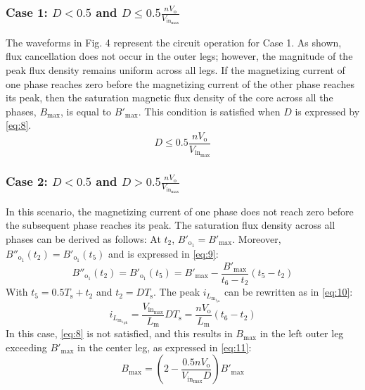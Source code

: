 \documentclass[lettersize,journal]{IEEEtran}
\begin{document}
\subsubsection*{\textup{Case 1: $D < 0.5$ and $D \le 0.5 \frac{n V_{\mathrm{o}}}{V_{\mathrm{in}_{\mathrm{max}}}}$}}
The waveforms in Fig. 4 represent the circuit operation for Case 1. As shown, flux cancellation does not occur in the outer legs; however, the magnitude of the peak flux density remains uniform across all legs. If the magnetizing current of one phase reaches zero before the magnetizing current of the other phase reaches its peak, then the saturation magnetic flux density of the core across all the phases, $B_{\mathrm{max}}$, is equal to $B'_{\mathrm{max}}$. This condition is satisfied when $D$ is expressed by \eqref{eq:8}.
\begin{equation}
\label{eq:8}
D \le 0.5 \frac{n V_{\mathrm{o}}}{V_{\mathrm{in}_{\mathrm{max}}}}
\end{equation}

\subsubsection*{\textup{Case 2: $D < 0.5$ and $D > 0.5 \frac{n V_{\mathrm{o}}}{V_{\mathrm{in}_{\mathrm{max}}}}$}}
In this scenario, the magnetizing current of one phase does not reach zero before the subsequent phase reaches its peak. The saturation flux density across all phases can be derived as follows: At $t_2$, $B'_{\mathrm{o}_1} = B'_{\mathrm{max}}$. Moreover, $B''_{\mathrm{o}_1}(t_2) = B'_{\mathrm{o}_1}(t_5)$ and is expressed in \eqref{eq:9}:
\begin{equation}
\label{eq:9}
B''_{\mathrm{o}_1}(t_2) = B'_{\mathrm{o}_1}(t_5) = B'_{\mathrm{max}} - \frac{B'_{\mathrm{max}}}{t_6 - t_2}(t_5 - t_2)
\end{equation}
With $t_5 = 0.5 T_{\mathrm{s}} + t_2$ and $t_2 = D T_{\mathrm{s}}$. The peak $i_{L_{\mathrm{m}_{1_{\mathrm{pk}}}}}$ can be rewritten as in \eqref{eq:10}:
\begin{equation}
\label{eq:10}
i_{L_{{{\mathrm{m}_1}_{\mathrm{pk}}}}} = \frac{V_{\mathrm{in}_{\mathrm{max}}}}{L_{\mathrm{m}}} D T_{\mathrm{s}} = \frac{n V_{\mathrm{o}}}{L_{\mathrm{m}}}(t_6 - t_2)
\end{equation}
In this case, \eqref{eq:8} is not satisfied, and this results in $B_{\mathrm{max}}$ in the left outer leg exceeding $B'_{\mathrm{max}}$ in the center leg, as expressed in \eqref{eq:11}:
\begin{equation}
\label{eq:11}
B_{\mathrm{max}} = \left(2 - \frac{0.5 n V_{\mathrm{o}}}{V_{\mathrm{in}_{\mathrm{max}}} D}\right) B'_{\mathrm{max}}
\end{equation}
\end{document}
